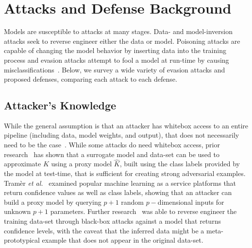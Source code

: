 \documentclass[lettersize,journal]{IEEEtran}
\newcommand{\cm}[1]{\textit{[{\color{blue}#1}]}}
\begin{document}



\section{Attacks and Defense Background}

Models are susceptible to attacks at many stages. Data- and model-inversion attacks seek to reverse engineer either the data or model. Poisoning attacks are capable of changing the model behavior by inserting data into the training process and evasion attacks attempt to fool a model at run-time by causing misclassifications~\cite{biggio_evasion_2013}. Below, we survey a wide variety of evasion attacks and proposed defenses, comparing each attack to each defense.

\subsection{Attacker's Knowledge}
 While the general assumption is that an attacker has whitebox access to an entire pipeline (including data, model weights, and output), that does not necessarily need to be the case~\cite{hopskipjump, chakraborty_adversarial_2018}. While some attacks do need whitebox access, prior research~\cite{hopskipjump, nelson2010behavior} has shown that a surrogate model and data-set can be used to approximate $K$ using a proxy model $\widehat{K}$, built using the class labels provided by the model at test-time, that is sufficient for creating strong adversarial examples. Tram\`er \textit{et al.}~\cite{tramer2016stealing} examined popular machine learning as a service platforms that return confidence values as well as class labels, showing that an attacker can build a proxy model by querying $ p + 1$ random $p-$dimensional inputs for unknown $p+1$ parameters. Further research~\cite{fredrikson_model_2015} was able to reverse engineer the training data-set through black-box attacks against a model that returns confidence levels, with the caveat that the inferred data might be a meta-prototypical example that does not appear in the original data-set.
\end{document}

